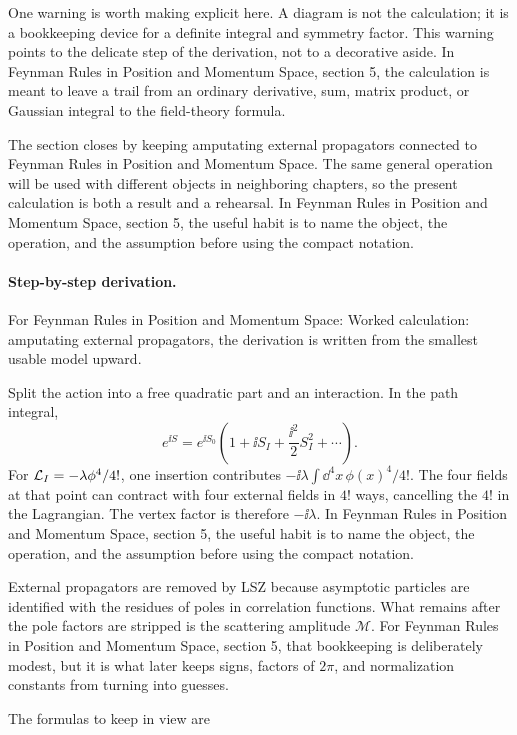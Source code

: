 One warning is worth making explicit here.  A diagram is not the calculation; it is a bookkeeping device for a definite integral and symmetry factor.  This warning points to the delicate step of the derivation, not to a decorative aside.  In Feynman Rules in Position and Momentum Space, section 5, the calculation is meant to leave a trail from an ordinary derivative, sum, matrix product, or Gaussian integral to the field-theory formula.

The section closes by keeping amputating external propagators connected to Feynman Rules in Position and Momentum Space.  The same general operation will be used with different objects in neighboring chapters, so the present calculation is both a result and a rehearsal.  In Feynman Rules in Position and Momentum Space, section 5, the useful habit is to name the object, the operation, and the assumption before using the compact notation.



\paragraph{Step-by-step derivation.}

For Feynman Rules in Position and Momentum Space: Worked calculation: amputating external propagators, the derivation is written from the smallest usable model upward.

Split the action into a free quadratic part and an interaction.  In the path integral,
\[
  e^{\ii S}=e^{\ii S_0}\left(1+\ii S_I+\frac{\ii^2}{2}S_I^2+\cdots\right).
\]
For \(\mathcal L_I=-\lambda\phi^4/4!\), one insertion contributes \(-\ii\lambda\int\dd^4x\,\phi(x)^4/4!\).  The four fields at that point can contract with four external fields in \(4!\) ways, cancelling the \(4!\) in the Lagrangian.  The vertex factor is therefore \(-\ii\lambda\).  In Feynman Rules in Position and Momentum Space, section 5, the useful habit is to name the object, the operation, and the assumption before using the compact notation.

External propagators are removed by LSZ because asymptotic particles are identified with the residues of poles in correlation functions.  What remains after the pole factors are stripped is the scattering amplitude \(\mathcal M\).  For Feynman Rules in Position and Momentum Space, section 5, that bookkeeping is deliberately modest, but it is what later keeps signs, factors of \(2\pi\), and normalization constants from turning into guesses.

The formulas to keep in view are

